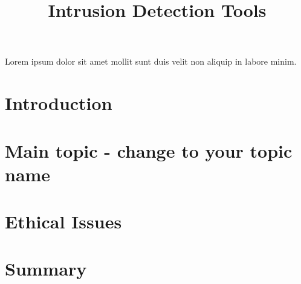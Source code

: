 \documentclass[conference]{IEEEtran}
\begin{document}
\title{Intrusion Detection Tools\\}

\author{
}


\maketitle




\begin{IEEEkeywords}
Lorem ipsum dolor sit amet mollit sunt duis velit non aliquip in labore minim.
\end{IEEEkeywords}

\section{Introduction}


\section{Main topic - change to your topic name}


\section{Ethical Issues}


\section{Summary}

\end{document}
